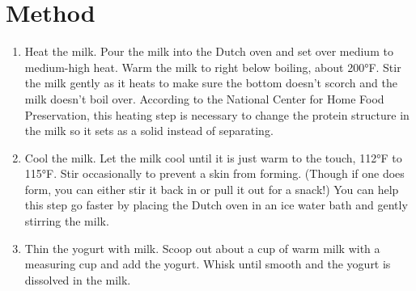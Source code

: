 \section{Method}
\begin{enumerate}
\item Heat the milk. Pour the milk into the Dutch oven and set over medium to medium-high heat. 
Warm the milk to right below boiling, about 200°F. Stir the milk gently as it heats to make sure the 
bottom doesn't scorch and the milk doesn't boil over. According to the National Center for Home Food 
Preservation, this heating step is necessary to change the protein structure in the milk so it sets as a 
solid instead of separating.

\item Cool the milk. Let the milk cool until it is just warm to the touch, 112°F to 115°F. 
Stir occasionally to prevent a skin from forming. (Though if one does form, you can either
stir it back in or pull it out for a snack!) You can help this step go faster by placing the Dutch
oven in an ice water bath and gently stirring the milk.

\item Thin the yogurt with milk. Scoop out about a cup of warm milk with a measuring cup and 
add the yogurt. Whisk until smooth and the yogurt is dissolved in the milk.


\end{enumerate}
